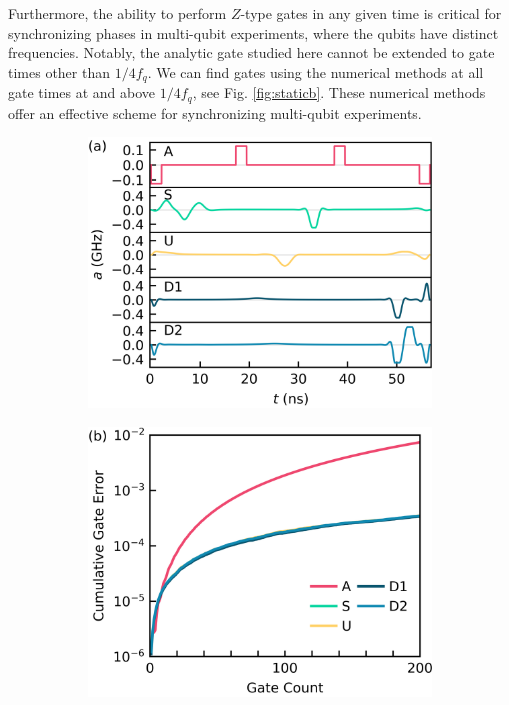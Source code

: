 \documentclass[
  amsfonts,
  amsmath,
  amssymb,
  pra,
  twocolumn,
  superscriptaddress,
]{revtex4-2}
\begin{document}
Furthermore, the ability to perform
$Z$-type gates in any given time is critical
for synchronizing phases in multi-qubit experiments,
where the qubits have distinct
frequencies. Notably, the analytic gate studied here cannot be extended
to gate times other than $1/4f_{q}$. 
We can find gates using the numerical methods at
all gate times at and above $1/4f_{q}$, see Fig. \ref{fig:staticb}.
These numerical methods offer an effective scheme for synchronizing
multi-qubit experiments.

\begin{figure}[ht]
  \begin{subfigure}{.4\textwidth}
    \includegraphics[width=\linewidth]{f3a.png}
    \caption{}
    \label{fig:stochastica}
  \end{subfigure}\hspace{0.05\textwidth}
  \begin{subfigure}{.4\textwidth}
    \includegraphics[width=\linewidth]{f3b.png}

\end{subfigure}
\end{figure}
\end{document}
